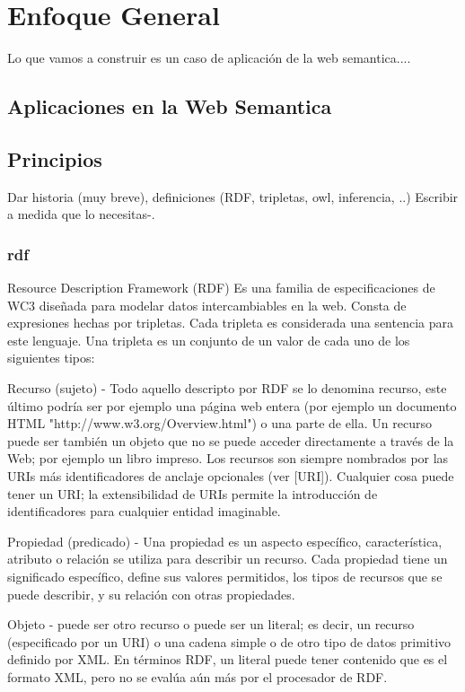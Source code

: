 \chapter{Enfoque General}
\label{chapter:estrategia}

Lo que vamos a construir es un caso de aplicación de la web semantica....

\section{Aplicaciones en la Web Semantica}
\section{Principios}
Dar historia (muy breve), definiciones  (RDF, tripletas, owl, inferencia, ..)
Escribir a medida que lo necesitas-.

\subsection{rdf}
Resource Description Framework (RDF)
Es una familia de especificaciones de WC3 diseñada para modelar datos intercambiables en la web. 
Consta de expresiones hechas por tripletas. Cada tripleta es considerada una sentencia para este lenguaje.
Una tripleta es un conjunto de un valor de cada uno de los siguientes tipos:

Recurso (sujeto) - Todo aquello descripto por RDF se lo denomina recurso, este último podría ser por ejemplo una página web entera (por ejemplo 
un documento HTML "http://www.w3.org/Overview.html") o una parte de ella.  Un recurso puede ser también un objeto que no 
se puede acceder directamente a través de la Web; por ejemplo un libro impreso. Los recursos son siempre nombrados por las 
URIs más identificadores de anclaje opcionales (ver [URI]). Cualquier cosa puede tener un URI; la extensibilidad de URIs 
permite la introducción de identificadores para cualquier entidad imaginable.

Propiedad (predicado) - Una propiedad es un aspecto específico, característica, atributo o relación se utiliza para describir un recurso. 
Cada propiedad tiene un significado específico, define sus valores permitidos, los tipos de recursos que se puede describir, 
y su relación con otras propiedades. 

Objeto - puede ser otro recurso o puede ser un literal; es decir, un recurso (especificado por un URI) o una cadena simple o 
de otro tipo de datos primitivo definido por XML. En términos RDF, un literal puede tener contenido que es el formato XML,
pero no se evalúa aún más por el procesador de RDF.


